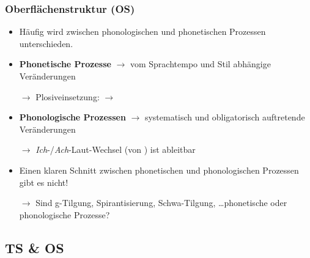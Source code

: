 \begin{frame}
\frametitle{{Oberflächenstruktur (OS)}}

\begin{itemize}
	\item Häufig wird zwischen phonologischen und phonetischen Prozessen unterschieden.
	\item[]
	\item \textbf{Phonetische Prozesse} $\rightarrow$ vom Sprachtempo und Stil abhängige Veränderungen
	\item[$\rightarrow$] Plosiveinsetzung:  $\rightarrow$ \textipa{[P a m p t]}
	\item[]
	\item \textbf{Phonologische Prozessen} $\rightarrow$ systematisch und obligatorisch auftretende Veränderungen
	\item[$\rightarrow$] \textit{Ich}-/\textit{Ach}-Laut-Wechsel \textipa{[b u: x]} (von ) ist ableitbar
	\item[]
	\item Einen klaren Schnitt zwischen phonetischen und phonologischen Prozessen gibt es nicht!
	\item[$\rightarrow$] Sind g-Tilgung, Spirantisierung, Schwa-Tilgung, \dots phonetische oder phonologische Prozesse?
\end{itemize}

\end{frame}



%
\subsection{TS \& OS}
%

